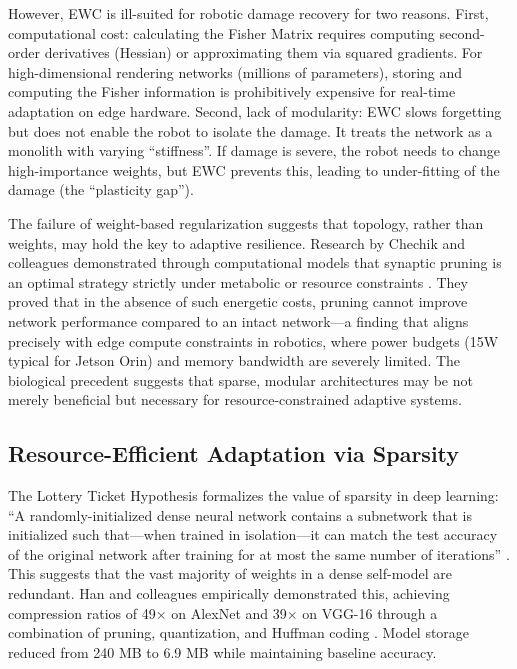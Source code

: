 \documentclass[12pt,a4paper,oneside]{report}
\begin{document}
However, EWC is ill-suited for robotic damage recovery for two reasons. First, computational cost: calculating the Fisher Matrix requires computing second-order derivatives (Hessian) or approximating them via squared gradients. For high-dimensional rendering networks (millions of parameters), storing and computing the Fisher information is prohibitively expensive for real-time adaptation on edge hardware. Second, lack of modularity: EWC slows forgetting but does not enable the robot to isolate the damage. It treats the network as a monolith with varying ``stiffness''. If damage is severe, the robot needs to change high-importance weights, but EWC prevents this, leading to under-fitting of the damage (the ``plasticity gap'').

The failure of weight-based regularization suggests that topology, rather than weights, may hold the key to adaptive resilience. Research by Chechik and colleagues demonstrated through computational models that synaptic pruning is an optimal strategy strictly under metabolic or resource constraints \cite{chechik1998synaptic}. They proved that in the absence of such energetic costs, pruning cannot improve network performance compared to an intact network---a finding that aligns precisely with edge compute constraints in robotics, where power budgets (15W typical for Jetson Orin) and memory bandwidth are severely limited. The biological precedent suggests that sparse, modular architectures may be not merely beneficial but necessary for resource-constrained adaptive systems.

\subsection{Resource-Efficient Adaptation via Sparsity}

The Lottery Ticket Hypothesis formalizes the value of sparsity in deep learning: ``A randomly-initialized dense neural network contains a subnetwork that is initialized such that---when trained in isolation---it can match the test accuracy of the original network after training for at most the same number of iterations'' \cite{frankle2018lottery}. This suggests that the vast majority of weights in a dense self-model are redundant. Han and colleagues empirically demonstrated this, achieving compression ratios of 49$\times$ on AlexNet and 39$\times$ on VGG-16 through a combination of pruning, quantization, and Huffman coding \cite{han2015deep}. Model storage reduced from 240 MB to 6.9 MB while maintaining baseline accuracy.
\end{document}
